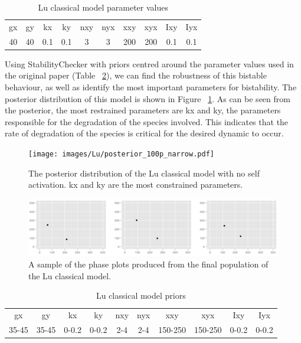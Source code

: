 \begin{table}[p]
\centering
\caption{Lu classical model parameter values}
\label{tab:lu_cl_bi}
\begin{tabular}{cccccccccc}
gx    & gy    & kx    & ky    & nxy & nyx & xxy     & xyx     & Ixy   & Iyx \\
40&40     &0.1   & 0.1   &  3  &  3  &  200    &  200    & 0.1    &   0.1
\end{tabular}
\end{table}

Using StabilityChecker with priors centred around the parameter values used in the original paper (Table ~\ref{tab:lu}), we can find the robustness of this bistable behaviour, as well as identify the most important parameters for bistability. The posterior distribution of this model is shown in Figure ~\ref{fig:lu_bistable}. As can be seen from the posterior, the most restrained parameters are kx and ky, the parameters responsible for the degradation of the species involved. This indicates that the rate of degradation of the species is critical for the desired dynamic to occur. 

\begin{figure}[p]
\centering
\texttt{[image: images/Lu/posterior\_100p\_narrow.pdf]}
\caption{The posterior distribution of the Lu classical model with no self activation. kx and ky are the most constrained parameters.}
\label{fig:lu_bistable}
\end{figure}


\clearpage
\begin{figure}[p]
\centering
\includegraphics[scale=0.4]{images/Lu/phase_plot.png}
\caption{A sample of the phase plots produced from the final population of the Lu classical model.}
\label{fig:lu_phase}
\end{figure}

\begin{table}[p]
\centering
\caption{Lu classical model priors}
\label{tab:lu}
\begin{tabular}{cccccccccc}
gx    & gy    & kx    & ky    & nxy & nyx & xxy     & xyx     & Ixy   & Iyx \\
35-45 & 35-45 & 0-0.2 & 0-0.2 & 2-4 & 2-4 & 150-250 & 150-250 & 0-0.2 &   0-0.2 
\end{tabular}
\end{table}

